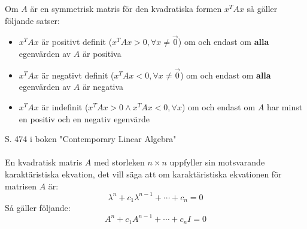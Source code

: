 \documentclass{report}
\begin{document}
\pagebreak

{
Om $A$ är en symmetrisk matris för den kvadratiska formen $x^T A x$ så gäller följande satser:
\begin{itemize}
	\item $x^T A x$ är positivt definit ($x^T A x > 0, \forall x \ne \vec{0}$) om och endast om \textbf{alla} egenvärden av $A$ är positiva
	\item $x^T A x$ är negativt definit ($x^T A x < 0, \forall x \ne \vec{0}$) om och endast om \textbf{alla} egenvärden av $A$ är negativa
	\item $x^T A x$ är indefinit ($x^T A x > 0 \land x^T A x < 0, \forall x$) om och endast om $A$ har minst en positiv och en negativ egenvärde
\end{itemize}
}

{
S. 474 i boken "Contemporary Linear Algebra"\\\\

En kvadratisk matris $A$ med storleken $n \times n$ uppfyller sin motsvarande karaktäristiska ekvation, det vill säga att om karaktäristiska ekvationen för matrisen $A$ är:
\[
\lambda^n + c_1 \lambda^{n-1} + \cdots + c_n = 0
\]
Så gäller följande:
\[
A^n + c_1 A^{n-1} + \cdots + c_n I = 0
\]
}
\end{document}
